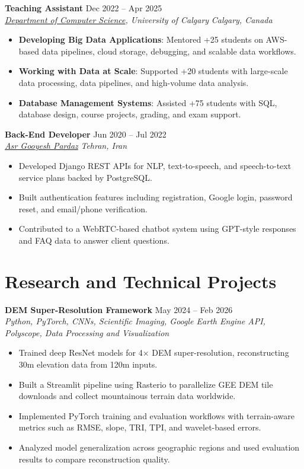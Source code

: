 \documentclass[a4paper,10pt]{article}
\newcommand{\resumeSubheading}[4]{
    \textbf{#1} \hfill #2 \\
    \textit{#3} \hfill \textit{#4}
}
\begin{document}
\resumeSubheading
{Teaching Assistant}
{Dec 2022 -- Apr 2025}
{\href{https://science.ucalgary.ca/computer-science} {Department of Computer Science}, University of Calgary}
{Calgary, Canada}
\begin{itemize}[leftmargin=0.25in]
    \item \textbf{Developing Big Data Applications}: Mentored +25 students on AWS-based data pipelines, cloud storage, debugging, and scalable data workflows.
    \item \textbf{Working with Data at Scale}: Supported +20 students with large-scale data processing, data pipelines, and high-volume data analysis.
    \item \textbf{Database Management Systems}: Assisted +75 students with SQL, database design, course projects, grading, and exam support.
\end{itemize}

\resumeSubheading
{Back-End Developer}
{Jun 2020 -- Jul 2022}
{\href{https://asr-gooyesh.com/en/}{Asr Gooyesh Pardaz}}
{Tehran, Iran}
\begin{itemize}[leftmargin=0.25in]
    \item Developed Django REST APIs for NLP, text-to-speech, and speech-to-text service plans backed by PostgreSQL.
    \item Built authentication features including registration, Google login, password reset, and email/phone verification.
    \item Contributed to a WebRTC-based chatbot system using GPT-style responses and FAQ data to answer client questions.
\end{itemize}


\section*{Research and Technical Projects}

\noindent
\textbf{DEM Super-Resolution Framework} \hfill May 2024 -- Feb 2026 \\
\textit{Python, PyTorch, CNNs, Scientific Imaging, Google Earth Engine API, Polyscope, Data Processing and Visualization}
\begin{itemize}[leftmargin=0.25in]
    \item Trained deep ResNet models for 4$\times$ DEM super-resolution, reconstructing 30m elevation data from 120m inputs.
    \item Built a Streamlit pipeline using Rasterio to parallelize GEE DEM tile downloads and collect mountainous terrain data worldwide.
    \item Implemented PyTorch training and evaluation workflows with terrain-aware metrics such as RMSE, slope, TRI, TPI, and wavelet-based errors.
    \item Analyzed model generalization across geographic regions and used evaluation results to compare reconstruction quality.
\end{itemize}
\end{document}
